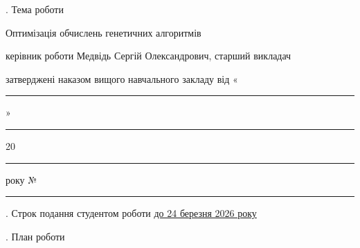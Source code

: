 \documentclass[12pt]{article}
\begin{document}
. Тема роботи {Оптимізація обчислень генетичних алгоритмів

\vspace{0.5cm}
\noindent керівник роботи {Медвідь Сергій Олександрович, старший викладач\hspace{1cm}}

\vspace{0.5cm}
\noindent затверджені наказом вищого навчального закладу від «\rule{0.6cm}{0.4pt}» \rule{2.5cm}{0.4pt} 20\rule{0.6cm}{0.4pt} року № \rule{1.5cm}{0.4pt}}

\vspace{0.2cm}

. Строк подання студентом роботи \underline{до 24 березня 2026 року\hspace{1.5cm}}

\vspace{0.2cm}

. План роботи

\vspace{0.3cm}
\end{document}
